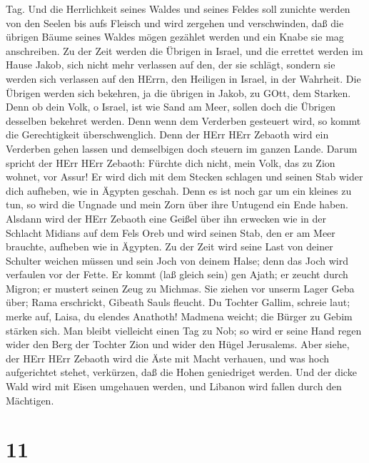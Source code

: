 Tag.  Und die Herrlichkeit seines Waldes und seines Feldes
soll zunichte werden von den Seelen bis aufs Fleisch und wird zergehen
und verschwinden,  daß die übrigen Bäume seines Waldes
mögen gezählet werden und ein Knabe sie mag anschreiben. 
Zu der Zeit werden die Übrigen in Israel, und die errettet werden im
Hause Jakob, sich nicht mehr verlassen auf den, der sie schlägt, sondern
sie werden sich verlassen auf den HErrn, den Heiligen in Israel, in der
Wahrheit.  Die Übrigen werden sich bekehren, ja die übrigen
in Jakob, zu GOtt, dem Starken.  Denn ob dein Volk, o
Israel, ist wie Sand am Meer, sollen doch die Übrigen desselben bekehret
werden. Denn wenn dem Verderben gesteuert wird, so kommt die
Gerechtigkeit überschwenglich.  Denn der HErr HErr Zebaoth
wird ein Verderben gehen lassen und demselbigen doch steuern im ganzen
Lande.  Darum spricht der HErr HErr Zebaoth: Fürchte dich
nicht, mein Volk, das zu Zion wohnet, vor Assur! Er wird dich mit dem
Stecken schlagen und seinen Stab wider dich aufheben, wie in Ägypten
geschah.  Denn es ist noch gar um ein kleines zu tun, so
wird die Ungnade und mein Zorn über ihre Untugend ein Ende haben.
 Alsdann wird der HErr Zebaoth eine Geißel über ihn
erwecken wie in der Schlacht Midians auf dem Fels Oreb und wird seinen
Stab, den er am Meer brauchte, aufheben wie in Ägypten.  Zu
der Zeit wird seine Last von deiner Schulter weichen müssen und sein
Joch von deinem Halse; denn das Joch wird verfaulen vor der Fette.
 Er kommt (laß gleich sein) gen Ajath; er zeucht durch
Migron; er mustert seinen Zeug zu Michmas.  Sie ziehen vor
unserm Lager Geba über; Rama erschrickt, Gibeath Sauls fleucht.
 Du Tochter Gallim, schreie laut; merke auf, Laisa, du
elendes Anathoth!  Madmena weicht; die Bürger zu Gebim
stärken sich.  Man bleibt vielleicht einen Tag zu Nob; so
wird er seine Hand regen wider den Berg der Tochter Zion und wider den
Hügel Jerusalems.  Aber siehe, der HErr HErr Zebaoth wird
die Äste mit Macht verhauen, und was hoch aufgerichtet stehet,
verkürzen, daß die Hohen geniedriget werden.  Und der dicke
Wald wird mit Eisen umgehauen werden, und Libanon wird fallen durch den
Mächtigen.

\hypertarget{section-10}{%
\section{11}\label{section-10}}

